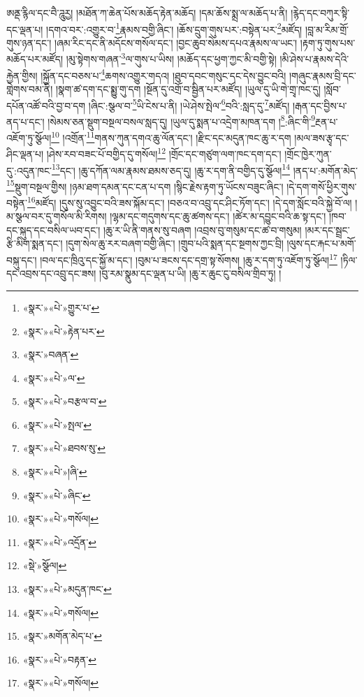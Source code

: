 \documentclass[12pt,a4paper]{book}
\begin{document}
ཨནྡ་རྙིལ་དང་བཻ་ཌཱུརྱ། །མཐོན་ཀ་ཆེན་པོས་མཆོད་རྟེན་མཆོད། །དམ་ཆོས་སྨྲ་ལ་མཆོད་པ་ནི། །རྙེད་དང་བཀུར་སྟི་དང་ལྡན་པ། །དགའ་བར་:འགྱུར་བ་\footnote{«སྣར་»«པེ་»གྱུར་པ་}རྣམས་བགྱི་ཞིང་། །ཆོས་དྲུག་གུས་པར་:བསྟེན་པར་\footnote{«སྣར་»«པེ་»རྟེན་པར་}མཛོད། །བླ་མ་རིམ་གྲོ་གུས་ཉན་དང་། །ཞམ་རིང་དང་ནི་མདོངས་གསོལ་དང་། །བྱང་ཆུབ་སེམས་དཔའ་རྣམས་ལ་ཡང་། །རྟག་ཏུ་གུས་པས་མཆོད་པར་མཛོད། །མུ་སྟེགས་གཞན་\footnote{«སྣར་»བཞན་}ལ་གུས་པ་ཡིས། །མཆོད་དང་ཕྱག་ཀྱང་མི་བགྱི་སྟེ། །མི་ཤེས་པ་རྣམས་དེའི་རྐྱེན་གྱིས། །སྐྱོན་དང་བཅས་པ་\footnote{«སྣར་»«པེ་»ལ་}ཆགས་འགྱུར་གདའ། །ཐུབ་དབང་གསུང་དང་དེས་བྱུང་བའི། །གཞུང་རྣམས་བྲི་དང་གླེགས་བམ་ནི། །སྣག་ཚ་དག་དང་སྨྱུ་གུ་དག །སྔོན་དུ་འགྲོ་བ་སྦྱིན་པར་མཛོད། །ཡུལ་དུ་ཡི་གེ་གྲྭ་ཁང་དུ། །སློབ་དཔོན་འཚོ་བའི་བྱ་བ་དག །ཞིང་:སྩལ་བ་\footnote{«སྣར་»«པེ་»བརྩལ་བ་}ཡི་ངེས་པ་ནི། །ཡེ་ཤེས་སྤེལ་\footnote{«སྣར་»«པེ་»སྤལ་}བའི་:སླད་དུ་\footnote{«སྣར་»«པེ་»ཐབས་སུ་}མཛོད། །རྒན་དང་བྱིས་པ་ནད་པ་དང་། །སེམས་ཅན་སྡུག་བསྔལ་བསལ་སླད་དུ། །ཡུལ་དུ་སྨན་པ་འདྲེག་མཁན་དག །\footnote{«སྣར་»«པེ་»།ཞི་}:ཞིང་གི་\footnote{«སྣར་»«པེ་»ཞིང་}རྔན་པ་འཇོག་ཏུ་སྩོལ།\footnote{«སྣར་»«པེ་»གསོལ།} །འགྲོན་\footnote{«སྣར་»«པེ་»འདྲོན་}གནས་ཀུན་དགའ་ཆུ་ལོན་དང་། །རྫིང་དང་མདུན་ཁང་ཆུ་ར་དག །མལ་ཟས་རྩྭ་དང་ཤིང་ལྡན་པ། །ཤེས་རབ་བཟང་པོ་བགྱིད་དུ་གསོལ།\footnote{«སྡེ་»སྩོལ།} །གྲོང་དང་གཙུག་ལག་ཁང་དག་དང་། །གྲོང་ཁྱེར་ཀུན་དུ་:འདུན་ཁང་\footnote{«སྣར་»«པེ་»མདུན་ཁང་}དང་། །ཆུ་དཀོན་ལམ་རྣམས་ཐམས་ཅད་དུ། །ཆུ་ར་དག་ནི་བགྱིད་དུ་སྩོལ།\footnote{«སྣར་»«པེ་»གསོལ།} །ནད་པ་:མགོན་མེད་\footnote{«སྣར་»མགོན་མེད་པ་}སྡུག་བསྔལ་གྱིས། །ཉམ་ཐག་དམན་དང་ངན་པ་དག །སྙིང་རྗེས་རྟག་ཏུ་ཡོངས་བཟུང་ཞིང་། །དེ་དག་གསོ་ཕྱིར་གུས་བསྟེན་\footnote{«སྣར་»«པེ་»བརྟན་}མཛོད། །དུས་སུ་འབྱུང་བའི་ཟས་སྐོམ་དང་། །བཅའ་བ་འབྲུ་དང་ཤིང་ཏོག་དང་། །དེ་དག་སློང་བའི་སྐྱེ་བོ་ལ། །མ་སྩལ་བར་དུ་གསོལ་མི་རིགས། །ལྷམ་དང་གདུགས་དང་ཆུ་ཚགས་དང་། །ཚེར་མ་དབྱུང་བའི་ཆ་སྟ་དང་། །ཁབ་དང་སྐུད་དང་བསིལ་ཡབ་དང་། །ཆུ་ར་ཡི་ནི་གནས་སུ་བཞག །འབྲས་བུ་གསུམ་དང་ཚ་བ་གསུམ། །མར་དང་སྦྲང་རྩི་མིག་སྨན་དང་། །དུག་སེལ་ཆུ་རར་བཞག་བགྱི་ཞིང་། །གྲུབ་པའི་སྨན་དང་སྔགས་ཀྱང་བྲི། །ལུས་དང་རྐང་པ་མགོ་བསྐུ་དང་། །བལ་དང་ཁྲིའུ་དང་སྐྱོ་མ་དང་། །བུམ་པ་ཟངས་དང་དགྲ་སྟ་སོགས། །ཆུ་ར་དག་ཏུ་འཇོག་ཏུ་སྩོལ།\footnote{«སྣར་»«པེ་»གསོལ།} །ཏིལ་དང་འབྲས་དང་འབྲུ་དང་ཟས། །བུ་རམ་སྣུམ་དང་ལྡན་པ་ཡི། །ཆུ་ར་ཆུང་ངུ་བསིལ་གྲིབ་ཏུ། །
\end{document}
